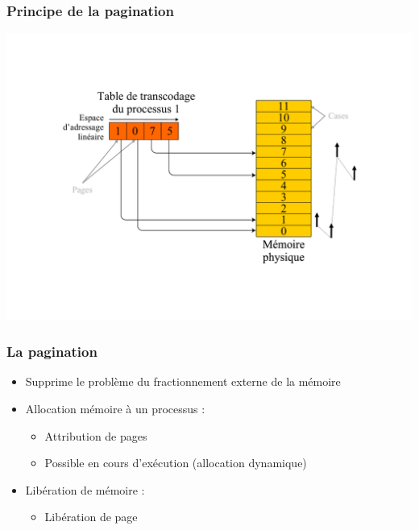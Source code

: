 \begin{frame}
\frametitle{Principe de la pagination}
\includegraphics[width=.9\textwidth]{../illustration/memoire_paginee_acces.pdf}
\end{frame}

\begin{frame}
\frametitle{La pagination}
\begin{itemize}
\item Supprime le problème du fractionnement externe de la mémoire
\item Allocation mémoire à un processus :
\begin{itemize}
\item Attribution de pages
\item Possible en cours d'exécution (allocation dynamique)
\end{itemize}
\item Libération de mémoire :
\begin{itemize}
\item Libération de page
\end{itemize}
\end{itemize}
\end{frame}


